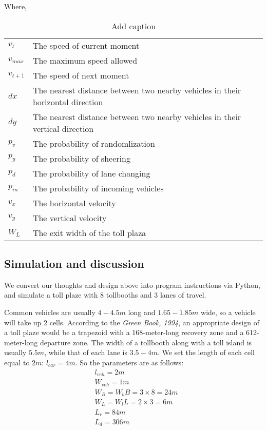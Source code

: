 \documentclass{mcmthesis}
\begin{document}
\begin{itemize}
 Where,

 \begin{table}[htbp]
   \centering
   \caption{Add caption}
     \begin{tabular}{ll}
     \toprule
     $v_t$  & The speed of current moment \\
     $v_{max}$ & The maximum speed allowed \\
     $v_{t+1}$ & The speed of next moment \\
     $dx$    & The nearest distance between two nearby vehicles in their horizontal direction \\
     $dy$    & The nearest distance between two nearby vehicles in their vertical direction \\
     $p_v$  & The probability of randomlization \\
     $p_y$  & The probability of sheering \\
     $p_d$  & The probability of lane changing \\
     $p_{in}$ & The probability of incoming vehicles \\
     $v_x$  & The horizontal velocity \\
     $v_y$  & The vertical velocity \\
     $W_L$  & The exit width of the toll plaza  \\
     \bottomrule
     \end{tabular}%
   \label{tab:addlabel}%
 \end{table}%



\end{itemize}
\subsection{Simulation and discussion}
We convert our thoughts and design above into program instructions via Python,
and simulate a toll plaze with 8 tollbooths and 3 lanes of travel.

Common vehicles are usually $4-4.5m$ long and $1.65-1.85m$ wide,
so a vehicle will take up 2 cells.
According to the \emph{Green Book, 1994}, an appropriate design of
a toll plaze would be a trapezoid with a
168-meter-long recovery zone and a 612-meter-long departure zone.
The width of a tollbooth along with a toll island
is usually $5.5m$, while that of each lane is $3.5-4m$.
We set the length of each cell equal to $2m$: $l_{car}=4m$.
So the parameters are as follows:
\[
\begin{align*}
&{l}_{veh}=2m\\
&{W}_{veh}=1m\\
&W_{B}={W}_{b}B=3\times8=24m\\
&W_{L}={W}_{l}L=2\times3=6m\\
&{L}_{r}=84m\\
&{L}_{d}=306m
\end{align*}
\]
\end{document}
